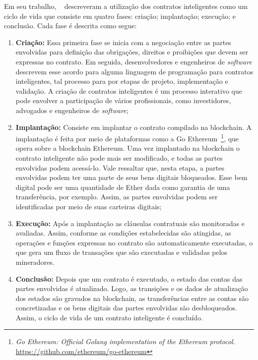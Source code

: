 Em seu trabalho, ~ descreveram a utilização dos contratos inteligentes como um ciclo de vida que consiste em quatro fases: criação; implantação; execução; e conclusão. Cada fase é descrita como segue:
\begin{enumerate}
    \item \textbf{Criação:} Essa primeira fase se inicia com a negociação entre as partes envolvidas para definição das obrigações, direitos e proibições que devem ser expressas no contrato. Em seguida, desenvolvedores e engenheiros de \textit{software} descrevem esse acordo para alguma linguagem de programação para contratos inteligentes, tal processo para por etapas de projeto, implementação e validação. A criação de contratos inteligentes é um processo interativo que pode envolver a participação de vários profissionais, como investidores, advogados e engenheiros de \textit{software};
    \item \textbf{Implantação:} Consiste em implantar o contrato compilado na blockchain. A implantação é feita por meio de plataformas como a Go Ethereum~\footnote{\textit{Go Ethereum: Official Golang implementation of the Ethereum protocol}. \url{https://github.com/ethereum/go-ethereum}}, que opera sobre a blockchain Ethereum. Uma vez implantado na blockchain o contrato inteligente não pode mais ser modificado, e todas as partes envolvidas podem acessá-lo. Vale ressaltar que, nesta etapa, a partes envolvidas podem ter uma parte de seus bens digitais bloqueados. Esse bem digital pode ser uma quantidade de Ether dada como garantia de uma transferência, por exemplo. Assim, as partes envolvidas podem ser identificadas por meio de suas carteiras digitais; 
    \item \textbf{Execução:} Após a implantação as cláusulas contratuais são monitoradas e avaliadas. Assim, conforme as condições estabelecidas são atingidas, as operações e funções expressas no contrato são automaticamente executadas, o que gera um fluxo de transações que são executadas e validadas pelos mineradores.
    \item \textbf{Conclusão:} Depois que um contrato é executado, o estado das contas das partes envolvidas é atualizado. Logo, as transições e os dados de atualização dos estados são gravados na blockchain, as transferências entre as contas são concretizadas e os bens digitais das partes envolvidas são desbloqueados. Assim, o ciclo de vida de um contrato inteligente é concluído. 
\end{enumerate}

